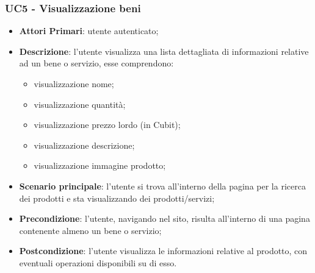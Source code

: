  \subsubsection{UC5 - Visualizzazione beni}
 \begin{itemize}
 	\item \textbf{Attori Primari}: utente autenticato;
 	\item \textbf{Descrizione}: l'utente visualizza una lista dettagliata di informazioni relative ad un bene o servizio, esse comprendono:
 	\begin{itemize}
 		\item visualizzazione nome;
 		\item visualizzazione quantità;
 		\item visualizzazione prezzo lordo (in Cubit\glo);
 		\item visualizzazione descrizione;
 		\item visualizzazione immagine prodotto;
 	\end{itemize}
 	\item \textbf{Scenario principale}: l'utente si trova all'interno della pagina per la ricerca dei prodotti e sta visualizzando dei prodotti/servizi;
 	
 	\item \textbf{Precondizione}: l'utente, navigando nel sito, risulta all'interno di una pagina contenente almeno un bene o servizio;
 	\item \textbf{Postcondizione}: l'utente visualizza le informazioni relative al prodotto, con eventuali operazioni disponibili su di esso.
 \end{itemize}
 